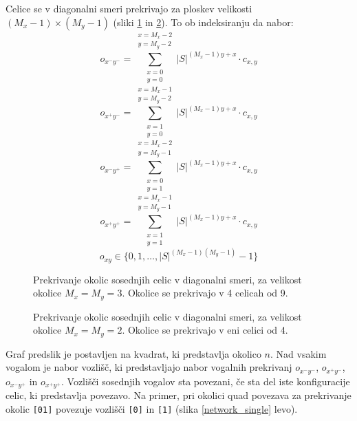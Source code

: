 \documentclass[12pt,a4paper,openany,twoside]{book}
\begin{document}
Celice se v diagonalni smeri prekrivajo za ploskev velikosti \((M_x-1) \times (M_y-1)\) (sliki \ref{overlap_diagonal_moore} in \ref{overlap_diagonal_quad}).
To ob indeksiranju da nabor:
\begin{equation}
o_{{x^-}{y^-}} = \sum_{\substack{x=0 \\ y=0}}^{\substack{x=M_x-2 \\ y=M_y-2}} |S|^{(M_x-1) y + x} \cdot c_{x,y}
\end{equation}
\begin{equation}
o_{{x^+}{y^-}} = \sum_{\substack{x=1 \\ y=0}}^{\substack{x=M_x-1 \\ y=M_y-2}} |S|^{(M_x-1) y + x} \cdot c_{x,y}
\end{equation}
\begin{equation}
o_{{x^-}{y^+}} = \sum_{\substack{x=0 \\ y=1}}^{\substack{x=M_x-2 \\ y=M_y-1}} |S|^{(M_x-1) y + x} \cdot c_{x,y}
\end{equation}
\begin{equation}
o_{{x^+}{y^+}} = \sum_{\substack{x=1 \\ y=1}}^{\substack{x=M_x-1 \\ y=M_y-1}} |S|^{(M_x-1) y + x} \cdot c_{x,y}
\end{equation}
\begin{equation}
o_{xy} \in \{0, 1, \dots, |S|^{(M_x-1)(M_y-1)}-1\}
\end{equation}

\begin{figure}[htb]
\centerline{}
\caption[Prekrivanje okolic \(3 \times 3\) - diagonalno.]
{Prekrivanje okolic sosednjih celic v diagonalni smeri, za velikost okolice \(M_x=M_y=3\).
Okolice se prekrivajo v 4 celicah od 9.}
\label{overlap_diagonal_moore}
\end{figure}

\begin{figure}[htb]
\centerline{}
\caption[Prekrivanje okolic \(2 \times 2\) - diagonalno.]
{Prekrivanje okolic sosednjih celic v diagonalni smeri, za velikost okolice \(M_x=M_y=2\).
Okolice se prekrivajo v eni celici od 4.}
\label{overlap_diagonal_quad}
\end{figure}

Graf predslik je postavljen na kvadrat, ki predstavlja okolico \(n\).
Nad vsakim vogalom je nabor vozlišč, ki predstavljajo nabor vogalnih prekrivanj
\(o_{{x^-}{y^-}}\), \(o_{{x^+}{y^-}}\), \(o_{{x^-}{y^+}}\) in \(o_{{x^+}{y^+}}\).
Vozlišči sosednjih vogalov sta povezani, če sta del iste konfiguracije celic,
ki predstavlja povezavo. Na primer, pri okolici quad povezava za prekrivanje okolic \verb|[01]|
povezuje vozlišči \verb|[0]| in \verb|[1]| (slika \ref{network_single} levo).
\end{document}
